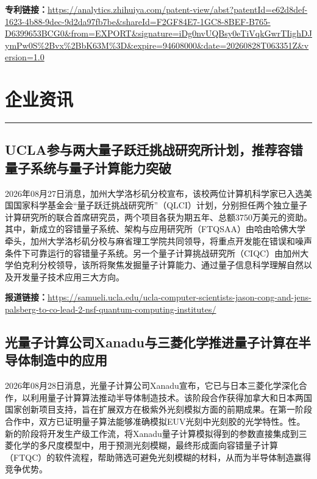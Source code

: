 \documentclass[12pt,a4paper]{ctexart}
\begin{document}
\noindent\textbf{专利链接：}\url{https://analytics.zhihuiya.com/patent-view/abst?patentId=e62d8def-1623-4b88-9dec-9d2da97fb7be&shareId=F2GF84E7-1GC8-8BEF-B765-D6399653BCG0&from=EXPORT&signature=iDg0nvUQBsy0eTiVqkGwrTIighDJymPw0S%2Bvx%2BbK63M%3D&expire=94608000&date=20260828T063351Z&version=1.0}




\newpage
\section{企业资讯}
\vspace{-0.5em}
\noindent\rule{\linewidth}{1.5pt}

\subsection{ UCLA参与两大量子跃迁挑战研究所计划，推荐容错量子系统与量子计算能力突破 }

2026年08月27日消息，加州大学洛杉矶分校宣布，该校两位计算机科学家已入选美国国家科学基金会“量子跃迁挑战研究所”（QLCI）计划，分别担任两个独立量子计算研究所的联合首席研究员，两个项目各获为期五年、总额3750万美元的资助。其中，新成立的容错量子系统、架构与应用研究所（FTQSAA）由哈由哈佛大学牵头，加州大学洛杉矶分校与麻省理工学院共同领导，将重点开发能在错误和噪声条件下可靠运行的容错量子系统。另一个量子计算挑战研究所（CIQC）由加州大学伯克利分校领导，该所将聚焦发掘量子计算能力、通过量子信息科学理解自然以及开发量子技术应用三大方向。

\noindent\textbf{报道链接：}\url{https://samueli.ucla.edu/ucla-computer-scientists-jason-cong-and-jens-palsberg-to-co-lead-2-nsf-quantum-computing-institutes/}

\subsection{ 光量子计算公司Xanadu与三菱化学推进量子计算在半导体制造中的应用 }

2026年08月28日消息，光量子计算公司Xanadu宣布，它已与日本三菱化学深化合作，以利用量子计算算法推动半导体制造技术。该阶段合作获得加拿大和日本两国国家创新项目支持，旨在扩展双方在极紫外光刻模拟方面的前期成果。在第一阶段合作中，双方已证明量子算法能够准确模拟EUV光刻中光刻胶的光学特性。性。新的阶段将开发生产级工作流，将Xanadu量子计算模拟得到的参数直接集成到三菱化学的多尺度模型中，用于预测光刻模糊，最终形成面向容错量子计算（FTQC）的软件流程，帮助筛选可避免光刻模糊的材料，从而为半导体制造赢得竞争优势。
\end{document}
